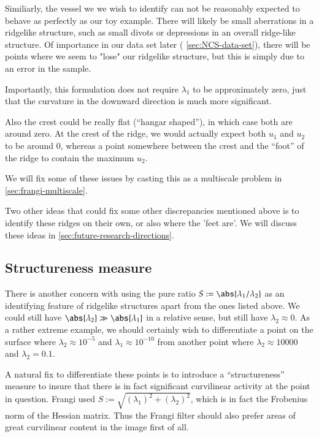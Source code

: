     Similiarly, the vessel we we wish to identify can not be reasonably expected to behave as perfectly as our toy example. There will likely be small aberrations in a ridgelike structure, such as small divots or depressions in an overall ridge-like structure. Of importance in our data set later ( \cref{sec:NCS-data-set}), there will be points where we seem to "lose" our ridgelike structure,
    but this is simply due to an error in the sample.
    
	Importantly, this formulation does not require $\lambda_1$ to be approximately zero, just that the curvature in the downward direction is much more significant.
    
    Also the crest could be really flat (``hangar shaped''), in which case both are around zero. At the crest of the ridge, we would actually expect both $u_1$ and $u_2$ to be around 0, whereas a point somewhere between the crest and the ``foot'' of the ridge to contain the maximum $u_2$.
    
    We will fix some of these issues by casting this as a multiscale problem in \cref{sec:frangi-multiscale}.
    
    Two other ideas that could fix some other discrepancies mentioned above is to identify these ridges on their own, or also where the 'feet are'. We will discuss these ideas in \cref{sec:future-research-directions}.
    
    \subsection{Structureness measure} \label{sec:frangi-structureness}
    
    There is another concern with using the pure ratio $S:= \abs{\lambda_1 / \lambda_2}$ as an identifying feature of ridgelike structures apart from the ones listed above. We could still have $\abs{\lambda_2} \gg \abs{\lambda_1}$ in a relative sense, but still have $\lambda_2 \approx 0$. As a rather extreme example, we should certainly wish to differentiate a point on the surface where $\lambda_2 \approx 10^{-5} $ and $\lambda_1 \approx 10^{-10}$ from another point where $\lambda_2 \approx 10000$ and $\lambda_2 = 0.1$.
    
    A natural fix to differentiate these points is to introduce a ``structureness'' measure to insure that there is in fact significant curvilinear activity at the point in question. Frangi used $S:= \sqrt{(\lambda_1)^2 + (\lambda_2)^2}$, which is in fact the Frobenius norm of the Hessian matrix. Thus the Frangi filter should also prefer areas of
    great curvilinear content in the image first of all.
    
